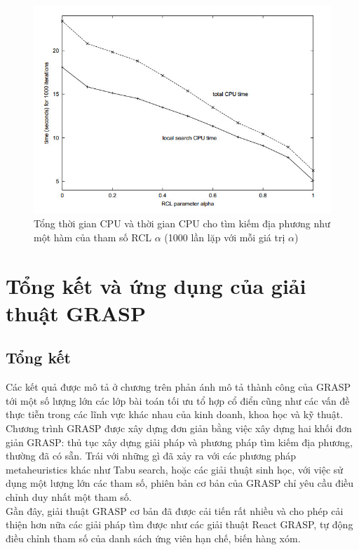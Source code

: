 \documentclass[14pt,a4paper]{report}
\begin{document}
\begin{center}
	\begin{figure}[htp]
		\begin{center}
			\includegraphics[scale=.55]{images/hinh1_10}
		\end{center}
		\caption{Tổng thời gian CPU và thời gian CPU cho tìm kiếm địa phương như một hàm của tham số RCL $\alpha$ (1000 lần lặp với mỗi giá trị $\alpha$)}
		\label{refhinh5}
	\end{figure}
\end{center}

\chapter{Tổng kết và ứng dụng của giải thuật GRASP}
\section{Tổng kết}
Các kết quả được mô tả ở chương trên phản ánh mô tả thành công của GRASP tới một số lượng lớn các lớp bài toán tối ưu tổ hợp cổ điển cũng như các vấn đề thực tiễn trong các lĩnh vực khác nhau của kinh doanh, khoa học và kỹ thuật.\\
Chương trình GRASP được xây dựng đơn giản bằng việc xây dựng hai khối đơn giản GRASP: thủ tục xây dựng giải pháp và phương pháp tìm kiếm địa phương, thường đã có sẵn. Trái với những gì đã xảy ra với các phương pháp metaheuristics khác như Tabu search, hoặc các giải thuật sinh học, với việc sử dụng một lượng lớn các tham số, phiên bản cơ bản của GRASP chỉ yêu cầu điều chỉnh duy nhất một tham số.\\
Gần đây, giải thuật GRASP cơ bản đã được cải tiến rất nhiều và cho phép cải thiện hơn nữa các giải pháp tìm được như các giải thuật React GRASP, tự động điều chỉnh tham số của danh sách ứng viên hạn chế, biến hàng xóm.
\end{document}

